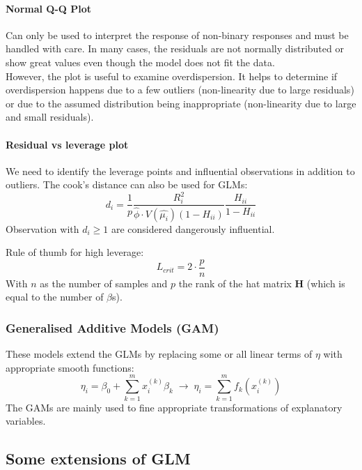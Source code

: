 \paragraph{Normal Q-Q Plot}
Can only be used to interpret the response of non-binary responses and must be handled with care. In many cases, the residuals are not normally distributed or show great values even though the model does not fit the data.\\
However, the plot is useful to examine overdispersion. It helps to determine if overdispersion happens due to a few outliers (non-linearity due to large residuals) or due to the assumed distribution being inappropriate (non-linearity due to large and small residuals).

\paragraph{Residual vs leverage plot}
We need to identify the leverage points and influential observations in addition to outliers. The cook's distance can also be used for GLMs:
\begin{equation*}
d_i = \frac{1}{p}\frac{R_i^2}{\hat{\phi}\cdot V(\hat{\mu_i})(1-H_{ii})}\frac{H_{ii}}{1-H_{ii}}
\end{equation*}
Observation with $d_i \geq 1$ are considered dangerously influential.

Rule of thumb for high leverage:
\begin{equation*}
	L_{crit} = 2\cdot \frac{p}{n}
\end{equation*}
With $n$ as the number of samples and $p$ the rank of the hat matrix $\bm{H}$ (which is equal to the number of $\beta$s).

\subsubsection{Generalised Additive Models (GAM)}
These models extend the GLMs by replacing some or all linear terms of $\eta$ with appropriate smooth functions:
\begin{equation*}
\eta_i = \beta_0+\sum_{k=1}^{m}x_i^{(k)}\beta_k \; \rightarrow \; \eta_i = \sum_{k=1}^{m}f_k\left(x_i^{(k)}\right)
\end{equation*}
The GAMs are mainly used to fine appropriate transformations of explanatory variables.

\subsection{Some extensions of GLM}

